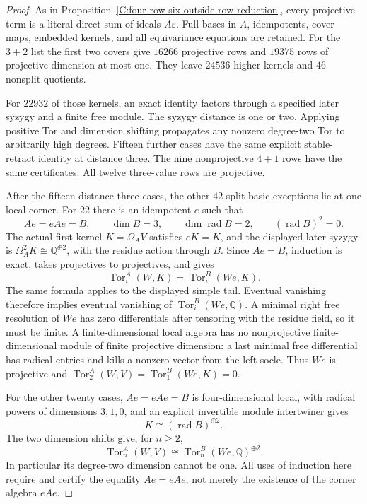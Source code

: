 \begin{proof}
As in Proposition~\ref{C:four-row-six-outside-row-reduction}, every
projective term is a literal direct sum of ideals $A\varepsilon$.
Full bases in $A$, idempotents, cover maps, embedded kernels, and
all equivariance equations are retained. For the $3+2$ list the
first two covers give $16266$ projective rows and $19375$ rows of
projective dimension at most one. They leave $24536$ higher kernels
and $46$ nonsplit quotients.

For $22932$ of those kernels, an exact identity factors through
a specified later syzygy and a finite free module. The syzygy
distance is one or two. Applying positive Tor and dimension shifting
propagates any nonzero degree-two Tor to arbitrarily high degrees.
Fifteen further cases have the same explicit stable-retract identity
at distance three. The nine nonprojective $4+1$ rows have the
same certificates. All twelve three-value rows are projective.

After the fifteen distance-three cases, the other $42$ split-basic
exceptions lie at one local corner. For $22$ there is an idempotent $e$
such that
\[
 Ae=eAe=B,\qquad\dim B=3,\qquad
 \dim\operatorname{rad}B=2,\qquad(\operatorname{rad}B)^2=0.
\]
The actual first kernel $K=\Omega_A V$ satisfies $eK=K$, and
the displayed later syzygy is
$\Omega_A^2K\cong\mathbb Q^{\oplus2}$, with the residue action
through $B$. Since $Ae=B$, induction is exact, takes projectives
to projectives, and gives
\[
 \operatorname{Tor}_i^A(W,K)
  =\operatorname{Tor}_i^B(We,K).
\]
The same formula applies to the displayed simple tail. Eventual
vanishing therefore implies eventual vanishing of
$\operatorname{Tor}_i^B(We,\mathbb Q)$. A minimal right free
resolution of $We$ has zero differentials after tensoring with
the residue field, so it must be finite. A finite-dimensional
local algebra has no nonprojective finite-dimensional module of
finite projective dimension: a last minimal free differential
has radical entries and kills a nonzero vector from the left
socle. Thus $We$ is projective and
$\operatorname{Tor}_2^A(W,V)=\operatorname{Tor}_1^B(We,K)=0$.

For the other twenty cases, $Ae=eAe=B$ is four-dimensional local,
with radical powers of dimensions $3,1,0$, and an explicit
invertible module intertwiner gives
\[
 K\cong(\operatorname{rad}B)^{\oplus2}.
\]
The two dimension shifts give, for $n\geq2$,
\[
 \operatorname{Tor}_n^A(W,V)
  \cong\operatorname{Tor}_n^B(We,\mathbb Q)^{\oplus2}.
\]
In particular its degree-two dimension cannot be one.
All uses of induction here require and certify the equality
$Ae=eAe$, not merely the existence of the corner algebra $eAe$.


\end{proof}
